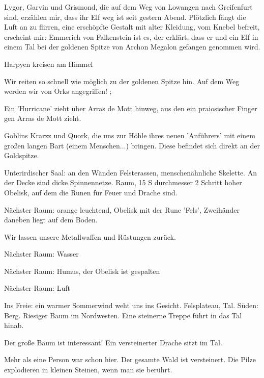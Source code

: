Lygor, Garvin und Grismond, die auf dem Weg von Lowangen nach Greifenfurt sind, erzählen mir, dass ihr Elf  weg ist seit gestern Abend. Plötzlich fängt die Luft an zu flirren, eine erschöpfte Gestalt mit alter Kleidung, vom Knebel befreit, erscheint mir: Emmerich von Falkenstein ist es, der erklärt, dass er und ein Elf in einem Tal bei der goldenen Spitze von Archon Megalon gefangen genommen wird. 

Harpyen kreisen am Himmel

Wir reiten so schnell wie möglich zu der goldenen Spitze hin. Auf dem Weg werden wir von Orks angegriffen!
;

Ein 'Hurricane' zieht über Arras de Mott hinweg, aus den ein praiosischer Finger gen Arras de Mott zieht. 

Goblins Krarzz und Quork, die uns zur Höhle ihres neuen 'Anführers' mit einem großen langen Bart (einem Menschen...) bringen. Diese befindet sich direkt an der Goldspitze. 

Unterirdischer Saal: an den Wänden Felsterassen, menschenähnliche Skelette. An der Decke sind dicke Spinnennetze. 
Raum, 15 S durchmesser 2 Schritt hoher Obelisk, auf dem die Runen für Feuer und Drache sind. 

Nächster Raum: orange leuchtend, Obelisk mit der Rune 'Fels', Zweihänder daneben liegt auf dem Boden. 

Wir lassen unsere Metallwaffen und Rüstungen zurück. 

Nächster Raum: Wasser 


Nächster Raum: Humus, der Obelisk ist gespalten

Nächster Raum: Luft

Ins Freie: ein warmer Sommerwind weht uns ins Gesicht. Felsplateau, Tal. Süden: Berg. Riesiger Baum im Nordwesten. Eine steinerne Treppe führt in das Tal hinab. 

Der große Baum ist interessant! Ein versteinerter Drache sitzt im Tal. 

Mehr als eine Person war schon hier. Der gesamte Wald ist versteinert. Die Pilze explodieren in kleinen Steinen, wenn man sie berührt. 

